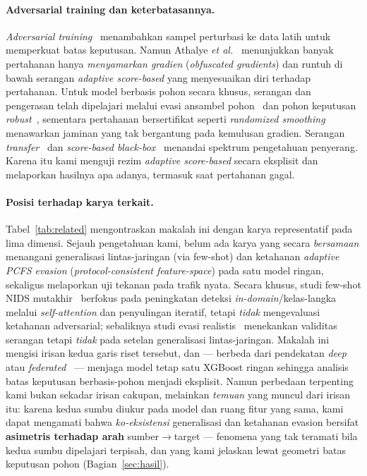 \documentclass[11pt,a4paper]{article}
\begin{document}
\paragraph{Adversarial training dan keterbatasannya.} \emph{Adversarial
training}~\cite{goodfellow2015,madry2018} menambahkan sampel perturbasi ke data
latih untuk memperkuat batas keputusan. Namun Athalye \emph{et
al.}~\cite{athalye2018} menunjukkan banyak pertahanan hanya \emph{menyamarkan
gradien} (\emph{obfuscated gradients}) dan runtuh di bawah serangan
\emph{adaptive score-based} yang menyesuaikan diri terhadap pertahanan. Untuk model
berbasis pohon secara khusus, serangan dan pengerasan telah dipelajari melalui
evasi ansambel pohon~\cite{kantchelian2016} dan pohon keputusan
\emph{robust}~\cite{chen2019robusttrees}, sementara pertahanan bersertifikat seperti
\emph{randomized smoothing}~\cite{cohen2019smoothing} menawarkan jaminan yang tak
bergantung pada kemulusan gradien. Serangan \emph{transfer}~\cite{papernot2016transfer}
dan \emph{score-based black-box}~\cite{ilyas2018blackbox} menandai spektrum
pengetahuan penyerang. Karena itu kami menguji rezim \emph{adaptive score-based}
secara eksplisit dan melaporkan hasilnya apa adanya, termasuk saat pertahanan gagal.

\paragraph{Posisi terhadap karya terkait.} Tabel~\ref{tab:related} mengontraskan
makalah ini dengan karya representatif pada lima dimensi. Sejauh pengetahuan kami,
belum ada karya yang secara \emph{bersamaan} menangani generalisasi lintas-jaringan
(via few-shot) dan ketahanan \emph{adaptive PCFS evasion} (\emph{protocol-consistent
feature-space}) pada satu model ringan, sekaligus melaporkan uji tekanan pada trafik
nyata. Secara khusus,
studi few-shot NIDS mutakhir~\cite{fewshot} berfokus pada peningkatan deteksi
\emph{in-domain}/kelas-langka melalui \emph{self-attention} dan penyulingan
iteratif, tetapi \emph{tidak} mengevaluasi ketahanan adversarial; sebaliknya studi
evasi realistis~\cite{apruzzese2023,merzouk2022,sheatsley2022} menekankan validitas
serangan tetapi \emph{tidak} pada setelan generalisasi lintas-jaringan. Makalah ini
mengisi irisan kedua garis riset tersebut, dan --- berbeda dari pendekatan
\emph{deep}~\cite{wu,duan} atau \emph{federated}~\cite{popoola,bertoli} --- menjaga
model tetap satu XGBoost ringan sehingga analisis batas keputusan berbasis-pohon
menjadi eksplisit. Namun perbedaan terpenting kami bukan sekadar irisan cakupan,
melainkan \emph{temuan} yang muncul dari irisan itu: karena kedua sumbu diukur pada
model dan ruang fitur yang sama, kami dapat mengamati bahwa \emph{ko-eksistensi}
generalisasi dan ketahanan evasion bersifat \textbf{asimetris terhadap arah}
sumber$\rightarrow$target --- fenomena yang tak teramati bila kedua sumbu dipelajari
terpisah, dan yang kami jelaskan lewat geometri batas keputusan pohon
(Bagian~\ref{sec:hasil}).
\end{document}
